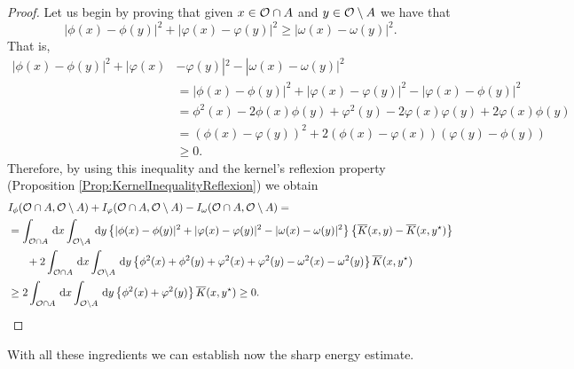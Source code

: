 \begin{proof}
Let us begin by proving that given $x\in \mathcal{O} \cap A$ and $y\in \mathcal{O} \setminus A$ we have that
$$ |\phi(x)-\phi(y)|^2+|\varphi(x)-\varphi(y)|^2\geq |\omega(x)-\omega(y)|^2. $$
That is,
\begin{align*}
|\phi(x)-\phi(y)|^2+|\varphi(x)&-\varphi(y)|^2 - |\omega(x)-\omega(y)|^2 \\
&= |\phi(x)-\phi(y)|^2+|\varphi(x)-\varphi(y)|^2 - |\varphi(x)-\phi(y)|^2 \\
&= \phi^2(x)-2\phi(x)\phi(y)+\varphi^2(y)-2\varphi(x)\varphi(y)+2\varphi(x)\phi(y) \\
&= \left( \phi(x) - \varphi(y)\right) ^2+2\left( \phi(x)-\varphi(x) \right) \left( \varphi(y)-\phi(y) \right) \\
&\geq 0.
\end{align*}
Therefore, by using this inequality and the kernel's reflexion property (Proposition \ref{Prop:KernelInequalityReflexion}) we obtain
\begin{align*}
I_\phi(\ocal\cap A, \ocal \setminus A) &+ I_\varphi(\ocal\cap A, \ocal \setminus A) - I_\omega(\ocal\cap A, \ocal \setminus A) = \\
&\hspace{-26mm}= \int_{\ocal\cap A} \d x \int_{\ocal\setminus A} \d y \left\{|\phi(x)-\phi(y)|^2+|\varphi(x)-\varphi(y)|^2-|\omega(x)-\omega(y)|^2 \right\} \left\{\overline{K}(x,y)-\overline{K}(x,y^\star)\right\} \\
&\hspace{-20mm}+ 2 \int_{\ocal\cap A} \d x \int_{\ocal\setminus A} \d y \left\{\phi^2(x)+\phi^2(y)+\varphi^2(x)+\varphi^2(y)-\omega^2(x)-\omega^2(y) \right\} \overline{K}(x,y^\star) \\
&\hspace{-26mm}\geq 2\int_{\ocal\cap A} \d x \int_{\ocal\setminus A} \d y \left\{
\phi^2(x)+\varphi^2(y)\right\} \overline{K}(x,y^\star) \geq 0.
\end{align*}
\end{proof}



With all these ingredients we can establish now the sharp energy estimate.

